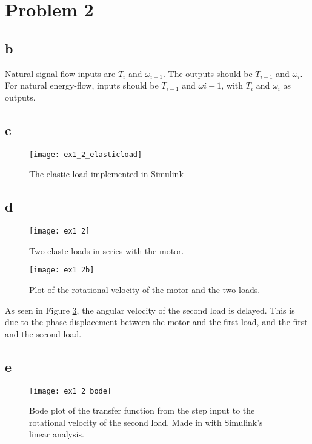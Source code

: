\documentclass{article}
\begin{document}
\newpage
\section{Problem 2}

\subsection{b}

Natural signal-flow inputs are $T_i$ and $\omega_{i-1}$. The outputs should be $T_{i-1}$ and $\omega_i$. For natural energy-flow, inputs should be $T_{i-1}$ and $\omega{i-1}$, with $T_i$ and $\omega_i$ as outputs. 

\subsection{c}

\begin{figure}[!ht]
    \centering
    \texttt{[image: ex1\_2\_elasticload]}
    \caption{The elastic load implemented in Simulink}
    \label{fig:elasticload} 
\end{figure}

\subsection{d}

\begin{figure}[!ht]
    \centering
    \texttt{[image: ex1\_2]}
    \caption{Two elastc loads in series with the motor.}
    \label{fig:twoloads} 
\end{figure}

\begin{figure}[!ht]
    \centering
    \texttt{[image: ex1\_2b]}
    \caption{Plot of the rotational velocity of the motor and the two loads.}
    \label{fig:veloplot} 
\end{figure}

As seen in Figure \ref{fig:veloplot}, the angular velocity of the second load is delayed. This is due to the phase displacement between the motor and the first load, and the first and the second load. 

\subsection{e}

\begin{figure}[!ht]
    \centering
    \texttt{[image: ex1\_2\_bode]}
    \caption{Bode plot of the transfer function from the step input to the rotational velocity of the second load.  Made in with Simulink's linear analysis.}
    \label{fig:bodeSimu} 
\end{figure}
\end{document}

